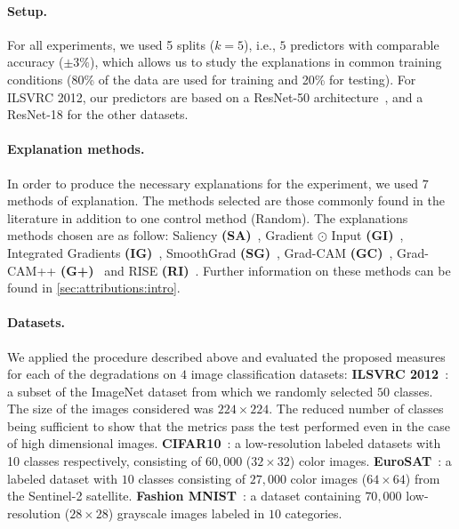\paragraph{Setup.} For all experiments, we used 5 splits ($k = 5$), i.e., $5$ predictors with comparable accuracy ($ \pm 3\%$), which allows us to study the explanations in common training conditions (80\% of the data are used for training and 20\% for testing).
For ILSVRC 2012, our predictors are based on a ResNet-50 architecture~\cite{he2016deep}, and a ResNet-18 for the other datasets.
\paragraph{Explanation methods.}
In order to produce the necessary explanations for the experiment, we used $7$ methods of explanation. 
The methods selected are those commonly found in the literature in addition to one control method (Random).
The explanations methods chosen are as follow: Saliency \textbf{(SA)}~\cite{simonyan2013deep}, Gradient $\odot$ Input \textbf{(GI)}~\cite{ancona2017better}, Integrated Gradients \textbf{(IG)}~\cite{sundararajan2017axiomatic}, SmoothGrad \textbf{(SG)}~\cite{smilkov2017smoothgrad}, Grad-CAM \textbf{(GC)}~\cite{Selvaraju_2019}, Grad-CAM++ \textbf{(G+)}~\cite{chattopadhay2018grad} and RISE \textbf{(RI)}~\cite{petsiuk2018rise}. Further information on these methods can be found in \autoref{sec:attributions:intro}.

\paragraph{Datasets.} We applied the procedure described above and evaluated the proposed measures for each of the degradations on $4$ image classification datasets: 
\textbf{ILSVRC 2012}~\cite{imagenet_cvpr09}: a subset of the ImageNet dataset from which we randomly selected $50$ classes. The size of the images considered was $224 \times 224$.
The reduced number of classes being sufficient to show that the metrics pass the test performed even in the case of high dimensional images.
\textbf{CIFAR10}~\cite{krizhevsky2009learning}: a low-resolution labeled datasets with 10 classes respectively, consisting of $60,000$ ($32 \times 32$) color images. 
\textbf{EuroSAT}~\cite{helber2019eurosat}: a labeled dataset with $10$ classes consisting of $27,000$ color images ($64 \times 64$) from the Sentinel-2 satellite.
\textbf{Fashion MNIST}~\cite{xiao2017fashion}: a dataset containing $70,000$ low-resolution ($28 \times 28$) grayscale images labeled in $10$ categories.

